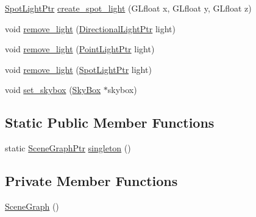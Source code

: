 \begin{DoxyCompactItemize}
\item 
\hyperlink{namespaceLarp_a5366be98946441fcea9b8a155bc52d95}{Spot\+Light\+Ptr} \hyperlink{classLarp_1_1SceneGraph_a0e50592fb802862fca698b058783d4c1}{create\+\_\+spot\+\_\+light} (G\+Lfloat x, G\+Lfloat y, G\+Lfloat z)
\item 
void \hyperlink{classLarp_1_1SceneGraph_af8d0d4ad89158d2ac8bbbba5ad4df763}{remove\+\_\+light} (\hyperlink{namespaceLarp_a38725e08be7b2ebb94f5f71eb0f0c692}{Directional\+Light\+Ptr} light)
\item 
void \hyperlink{classLarp_1_1SceneGraph_a86e77fb45d38becb474c641db68ac8a7}{remove\+\_\+light} (\hyperlink{namespaceLarp_a07215808e8e3c5229ca8549c5450e3e5}{Point\+Light\+Ptr} light)
\item 
void \hyperlink{classLarp_1_1SceneGraph_a8076428919fdcee0b0b68525dc3ec9e6}{remove\+\_\+light} (\hyperlink{namespaceLarp_a5366be98946441fcea9b8a155bc52d95}{Spot\+Light\+Ptr} light)
\item 
void \hyperlink{classLarp_1_1SceneGraph_ac0165b41ce86e4aed2f5c8acd9d4dc27}{set\+\_\+skybox} (\hyperlink{classLarp_1_1SkyBox}{Sky\+Box} $\ast$skybox)
\end{DoxyCompactItemize}
\subsection*{Static Public Member Functions}
\begin{DoxyCompactItemize}
\item 
static \hyperlink{namespaceLarp_acf02d81e4b52238dcd17cb6249eadadc}{Scene\+Graph\+Ptr} \hyperlink{classLarp_1_1SceneGraph_a569504ef263e392f9376bd50bb09a912}{singleton} ()
\end{DoxyCompactItemize}
\subsection*{Private Member Functions}
\begin{DoxyCompactItemize}
\item 
\hyperlink{classLarp_1_1SceneGraph_a256e0ff974a0f905a848a99f18b7ffc4}{Scene\+Graph} ()
\end{DoxyCompactItemize}
